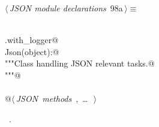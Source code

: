 \documentclass[
    a4paper,      %
    10pt,         %
    openright,    %
    notitlepage,  %
    parskip=half, %
]{scrreprt}       %
\theoremstyle{definition}                    %
\begin{document}
\begin{flushleft} \small
\begin{minipage}{\linewidth}\label{scrap162}\raggedright\small
{} $\langle\,${\itshape JSON module declarations}\nobreak\ {\footnotesize {98a}}$\,\rangle\equiv$
\vspace{-1exm}
\begin{list}{}{} \item
\mbox{}\lstinline@@\\
\mbox{}\lstinline@common.with_logger@\\
\mbox{}\lstinline@class Json(object):@\\
\mbox{}\lstinline@    """Class handling JSON relevant tasks.@\\
\mbox{}\lstinline@    """@\\
\mbox{}\lstinline@@\\
\mbox{}\lstinline@    @\hbox{$\langle\,${\itshape JSON methods}\nobreak\ {\footnotesize {}, \ldots\ }$\,\rangle$}\lstinline@@\\
\mbox{}\lstinline@@{\NWsep}
\end{list}
\vspace{-1.5ex}
\footnotesize
\begin{list}{}{\setlength{\itemsep}{-\parsep}\setlength{\itemindent}{-\leftmargin}}
\item \NWtxtMacroRefIn\ .

\item{}
\end{list}
\end{minipage}\vspace{4ex}
\end{flushleft}
\end{document}
